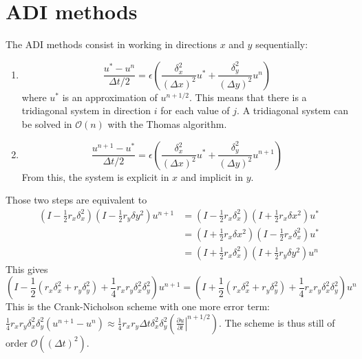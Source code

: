 \documentclass[12pt, openany]{report}
\theoremstyle{definition}
\begin{document}
\section{ADI methods}
The ADI methods consist in working in directions $x$ and $y$ sequentially:
\begin{enumerate}
	\item \begin{equation}
		\frac{u^*-u^n}{\Delta t/2} = \epsilon \left(\frac{\delta_x^2}{(\Delta x)^2}u^* + \frac{\delta_y^2}{(\Delta y)^2}u^n\right)
	\end{equation}
	where $u^*$ is an approximation of $u^{n+1/2}$. This means that there is a tridiagonal system in direction $i$ for each value of $j$. A tridiagonal system can be solved in $\mathcal{O}(n)$ with the Thomas algorithm. 
	\item \begin{equation}
		\frac{u^{n+1}- u^*}{\Delta t/2} = \epsilon \left(\frac{\delta_x^2}{(\Delta x)^2}u^* + \frac{\delta_y^2}{(\Delta y)^2}u^{n+1}\right)
	\end{equation}
	From this, the system is explicit in $x$ and implicit in $y$. 
\end{enumerate}
Those two steps are equivalent to 
\begin{equation}
	\begin{aligned}
		\left(I-\frac{1}{2}r_x\delta_x^2\right)\left(I-\frac{1}{2}r_y\delta y^2\right)u^{n+1} &= \left(I-\frac{1}{2}r_x\delta_x^2\right)\left(I+\frac{1}{2}r_x\delta x^2\right)u^*\\
		&= \left(I+\frac{1}{2}r_x\delta x^2\right)\left(I-\frac{1}{2}r_x\delta_x^2\right)u^*\\
		&= \left(I+\frac{1}{2}r_x\delta_x^2\right)\left(I+\frac{1}{2}r_y\delta y^2\right)u^n
	\end{aligned}
\end{equation}
This gives 
\begin{equation}
	\left(I-\frac{1}{2}\left(r_x\delta_x^2 + r_y\delta_y^2\right) + \frac{1}{4}r_xr_y\delta_x^2\delta_y^2\right)u^{n+1} = \left(I+\frac{1}{2}\left(r_x\delta_x^2 + r_y\delta_y^2\right) + \frac{1}{4}r_xr_y\delta_x^2\delta_y^2\right)u^{n}
\end{equation}
This is the Crank-Nicholson scheme with one more error term: $\frac{1}{4}r_xr_y\delta_x^2 \delta_y^2(u^{n+1}-u^n)\approx \frac{1}{4}r_xr_y\Delta t\delta_x^2\delta_y^2\left(\left.\frac{\partial u}{\partial t}\right|^{n+1/2}\right)$. The scheme is thus still of order $\mathcal{O}((\Delta t)^2)$. \\
\end{document}
